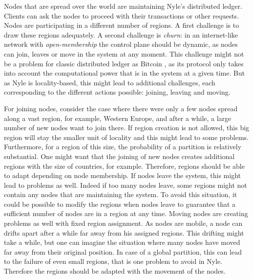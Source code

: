 \documentclass[a4paper,11pt,twoside,openright]{report}
\begin{document}
Nodes that are spread over the world are maintaining Nyle's distributed ledger. Clients can ask the nodes to proceed with their transactions or
other requests. Nodes are participating in a different number of regions. A
first challenge is to draw these regions adequately. A second challenge is \textit{churn}: in an internet-like network with \textit{open-membership}  the control plane should be dynamic, as nodes can join, leaves or move in the system at any moment. This challenge might not be a
problem for classic distributed ledger as Bitcoin \cite{Nakamoto2009}, as its
protocol only takes into account the computational power that is in the system
at a given time. But as Nyle is locality-based, this might lead to additional
challenges, each corresponding to the different actions possible: joining,
leaving and moving.

For joining nodes, consider the case where there were only
a few nodes spread along a vast region, for example, Western Europe, and after a
while, a large number of new nodes want to join there. If region creation is not allowed, this big region will stay the smaller unit of locality and this might lead to some problems.
Furthermore, for a region of
this size, the probability of a partition is relatively substantial. One might
want that the joining of new nodes creates additional regions with the size of countries, for example. Therefore, regions should be able to adapt
depending on node membership. If nodes leave the system, this might lead to
problems as well. Indeed if too many nodes leave, some regions might not contain any nodes that are maintaining the system. To
avoid this situation, it could be possible to modify the regions when nodes leave to
guarantee that a sufficient number of nodes are in a region at any time. Moving
nodes are creating problems as well with fixed region assignment. As nodes are mobile, a node can drifts apart after a while far away from his assigned regions. This drifting might take a while, but one can imagine the situation
where many nodes have moved far away from their original position. In case
of a global partition, this can lead to the failure of even small regions, that
is one problem to avoid in Nyle. Therefore the regions should be
adapted with the movement of the nodes. 
\end{document}
